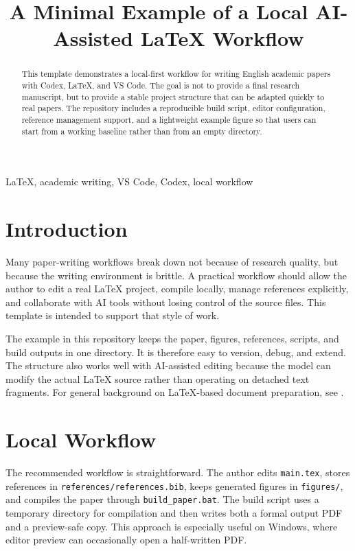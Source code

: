 ﻿\documentclass[conference]{IEEEtran}
\title{A Minimal Example of a Local AI-Assisted LaTeX Workflow}
\author{
\IEEEauthorblockN{Sample Author}
\IEEEauthorblockA{
Open Research Workflow Lab\\
sample@example.com
}
}
\begin{document}
\maketitle

\begin{abstract}
This template demonstrates a local-first workflow for writing English academic papers with Codex, LaTeX, and VS Code. The goal is not to provide a final research manuscript, but to provide a stable project structure that can be adapted quickly to real papers. The repository includes a reproducible build script, editor configuration, reference management support, and a lightweight example figure so that users can start from a working baseline rather than from an empty directory.
\end{abstract}

\begin{IEEEkeywords}
LaTeX, academic writing, VS Code, Codex, local workflow
\end{IEEEkeywords}

\section{Introduction}
Many paper-writing workflows break down not because of research quality, but because the writing environment is brittle. A practical workflow should allow the author to edit a real LaTeX project, compile locally, manage references explicitly, and collaborate with AI tools without losing control of the source files. This template is intended to support that style of work.

The example in this repository keeps the paper, figures, references, scripts, and build outputs in one directory. It is therefore easy to version, debug, and extend. The structure also works well with AI-assisted editing because the model can modify the actual LaTeX source rather than operating on detached text fragments. For general background on LaTeX-based document preparation, see \cite{lamport1994latex}.

\section{Local Workflow}
The recommended workflow is straightforward. The author edits \texttt{main.tex}, stores references in \texttt{references/references.bib}, keeps generated figures in \texttt{figures/}, and compiles the paper through \texttt{build\_paper.bat}. The build script uses a temporary directory for compilation and then writes both a formal output PDF and a preview-safe copy. This approach is especially useful on Windows, where editor preview can occasionally open a half-written PDF.
\end{document}
